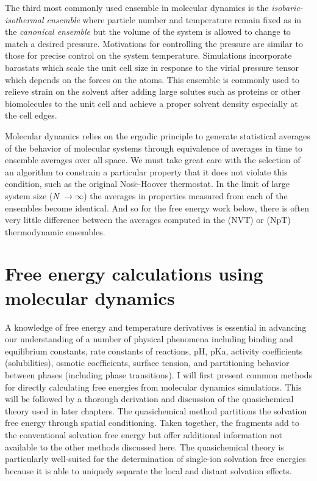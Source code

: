 \begin{theory}
  The third most commonly used ensemble in molecular  dynamics is the \emph{isobaric-isothermal ensemble} where particle 
  number and temperature remain fixed as in the \emph{canonical ensemble} but the volume of the system is allowed to change
  to match a desired pressure. Motivations for controlling the pressure are similar to those for precise control on the 
  system temperature. Simulations incorporate barostats which scale the unit cell size in response to the virial pressure
  tensor which depends on the forces on the atoms. This ensemble is commonly used to relieve strain on the solvent after 
  adding large solutes such as proteins or other biomolecules to the unit cell and achieve a proper solvent density 
  especially at the cell edges. 
  
  Molecular dynamics relies on the ergodic principle to generate statistical averages of the behavior of molecular 
  systems through equivalence of averages in time to ensemble averages over all space. We must take great care with the 
  selection of an algorithm to constrain a particular property that it does not violate this condition, such as the original 
  Nos$\acute{e}$-Hoover thermostat. In the limit of large system size (\emph{N} $\rightarrow \infty$) the averages in 
  properties measured from each of the ensembles become identical. And so for the free energy work below, there is often
  very little difference between the averages computed in the (NVT) or (NpT) thermodynamic ensembles\cite{tlbbook}.
  
 \section{\label{ch2:sec4:level1}Free energy calculations using molecular dynamics}
 A knowledge of free energy and temperature derivatives is essential in advancing our understanding of a number of physical 
 phenomena including binding and equilibrium constants, rate constants of reactions, pH, pKa, activity coefficients 
 (solubilities), osmotic coefficients, surface tension, and partitioning behavior between phases (including phase transitions). 
 I will first present common methods for directly calculating free energies from molecular dynamics simulations. This will
 be followed by a thorough derivation and discussion of the quasichemical theory used in later chapters. The quasichemical 
 method partitions the solvation free energy through spatial conditioning. Taken together, the fragments add to the conventional
 solvation free energy but offer additional information not available to the other methods discussed here. The quasichemical 
 theory is particularly well-suited for the determination of single-ion solvation free energies because it is able to uniquely
 separate the local and distant solvation effects.
 

\end{theory}
